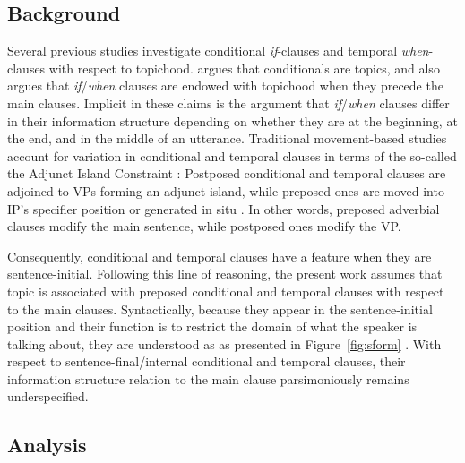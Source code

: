 \subsection{Background} 
\label{10:ssec:adjunct:background}



Several previous studies investigate conditional \textit{if}-clauses
and temporal \textit{when}-clauses with respect to topichood.
\citet{haiman:78} argues that conditionals are topics, and
\citet{ramsay:87} also argues that \textit{if}/\textit{when} clauses
are endowed with topichood when they precede the main clauses.
Implicit in these claims is the argument that
\textit{if}/\textit{when} clauses differ in their information
structure depending on whether they are at the beginning, at the end,
and in the middle of an utterance.  Traditional movement-based studies
account for variation in conditional and temporal clauses in terms of
the so-called the Adjunct Island Constraint \citep{huang:82}:
Postposed conditional and temporal clauses are adjoined to VPs forming
an adjunct island, while preposed ones are moved into IP's specifier
position \citep{iatridou:91} or generated in situ
\citep{taylor:07}.  In other words, preposed adverbial clauses modify
the main sentence, while postposed ones modify the VP.



Consequently, conditional and temporal clauses have a  feature
when they are sentence-initial.  Following this line of reasoning, the
present work assumes that topic is associated with preposed
conditional and temporal clauses with respect to the main
clauses. Syntactically, because they appear in the sentence-initial
position and their function is to restrict the domain of what the
speaker is talking about, they are understood as 
as presented in
Figure~\ref{fig:sform} . With
respect to sentence-final/internal conditional and temporal clauses,
their information structure relation to the main clause parsimoniously
remains underspecified.



\subsection{Analysis}
\label{10:ssec:adjunct:analysis}

